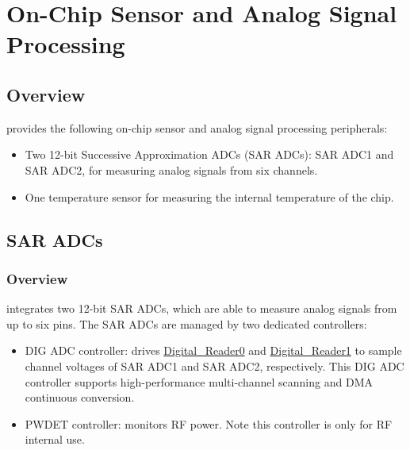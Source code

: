 \documentclass[main\_\_EN.tex]{subfiles}
\begin{document}

\ifglobal
\else
    {\let\clearpage\relax \listoftodos}
    \tableofcontents
\fi



\hypertarget{sensor}{}
\chapter{On-Chip Sensor and Analog Signal Processing}
\label{mod:sensor}

\section{Overview}

\chipname{} provides the following on-chip sensor and analog signal processing peripherals:

\begin{itemize}
    \item Two 12-bit Successive Approximation ADCs (SAR ADCs): SAR ADC1 and SAR ADC2, for measuring analog signals from six channels.
    \item One temperature sensor for measuring the internal temperature of the \chipname{} chip.
\end{itemize}

\section{SAR ADCs}\label{sec:sensor-sar-adc}

\subsection{Overview}

\chipname{} integrates two 12-bit SAR ADCs, which are able to measure analog signals from up to six pins. The SAR ADCs are managed by two dedicated controllers:

\begin{itemize}
    \item DIG ADC controller: drives  \hyperref[other:sensor-item-read-data-from-sar-adc1]{Digital\_Reader0} and  \hyperref[other:sensor-item-read-data-from-sar-adc1]{Digital\_Reader1} to sample channel voltages of SAR ADC1 and SAR ADC2, respectively. This DIG ADC controller supports high-performance multi-channel scanning and DMA continuous conversion.
    \item PWDET controller: monitors RF power. Note this controller is only for RF internal use.
\end{itemize}
\end{document}
